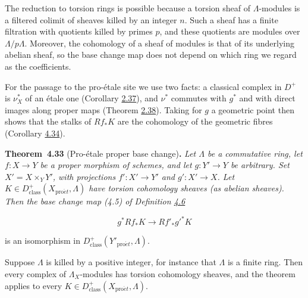 \documentclass[11pt]{article}
\newenvironment{bpstatement}[2]{\par\addvspace{0.6\baselineskip}\noindent\textbf{#1}#2\textbf{.}\enspace\ignorespaces}
  {\par\addvspace{0.4\baselineskip}}
\newenvironment{bpstatementit}[2]{\begin{bpstatement}{#1}{#2}\itshape\ignorespaces}{\end{bpstatement}}
\begin{document}
The reduction to torsion rings is possible because a torsion sheaf of \(\Lambda\)-modules is a filtered colimit of sheaves killed by an integer \(n\). Such a sheaf has a finite filtration with quotients killed by primes \(p\), and these quotients are modules over \(\Lambda/p\Lambda\). Moreover, the cohomology of a sheaf of modules is that of its underlying abelian sheaf, so the base change map does not depend on which ring we regard as the coefficients.

For the passage to the pro-étale site we use two facts: a classical complex in \(D^+\) is \(\nu_X^*\) of an étale one (Corollary \hyperref[bp109]{2.37}), and \(\nu^*\) commutes with \(g^*\) and with direct images along proper maps (Theorem \hyperref[bp113]{2.38}). Taking for \(g\) a geometric point then shows that the stalks of \(Rf_*K\) are the cohomology of the geometric fibres (Corollary \hyperref[bp386]{4.34}).

\label{bp382}%
\begin{bpstatementit}{Theorem~4.33}{ (Pro-étale proper base change)}
Let \(\Lambda\) be a commutative ring, let \(f:X\to Y\) be a proper morphism of schemes, and let \(g:Y'\to Y\) be arbitrary. Set \(X'=X\times_YY'\), with projections \(f':X'\to Y'\) and \(g':X'\to X\). Let \(K\in D^+_{\mathrm{class}}(X_{\mathrm{pro}\acute{e}t},\Lambda)\) have torsion cohomology sheaves (as abelian sheaves). Then the base change map (4.5) of Definition \hyperref[bp302]{4.6}

\[
g^*Rf_*K\longrightarrow Rf'_*g'^*K
\]

is an isomorphism in \(D^+_{\mathrm{class}}(Y'_{\mathrm{pro}\acute{e}t},\Lambda)\).
\end{bpstatementit}

\label{bp383}%
Suppose \(\Lambda\) is killed by a positive integer, for instance that \(\Lambda\) is a finite ring. Then every complex of \(\Lambda_X\)-modules has torsion cohomology sheaves, and the theorem applies to every \(K\in D^+_{\mathrm{class}}(X_{\mathrm{pro}\acute{e}t},\Lambda)\).
\end{document}

